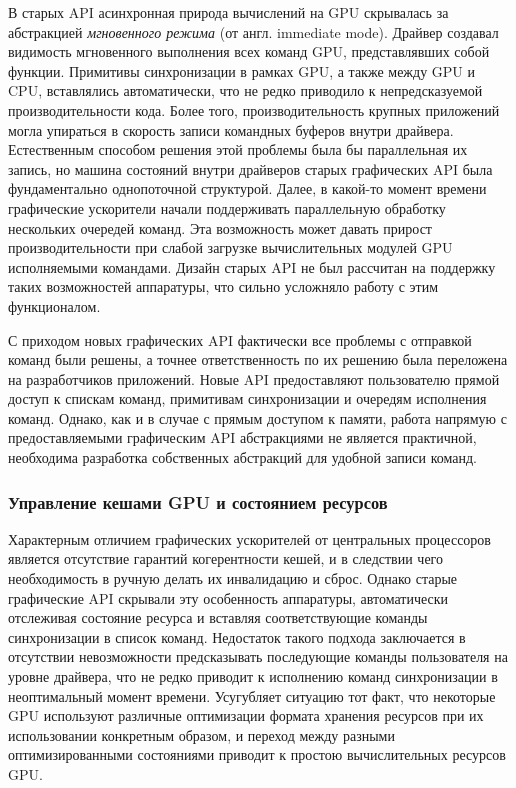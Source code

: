 В старых API асинхронная природа вычислений на GPU скрывалась за абстракцией \textit{мгновенного режима} (от англ. immediate mode).
Драйвер создавал видимость мгновенного выполнения всех команд GPU, представлявших собой функции.
Примитивы синхронизации в рамках GPU, а также между GPU и CPU, вставлялись автоматически, что не редко приводило к непредсказуемой производительности кода.
Более того, производительность крупных приложений могла упираться в скорость записи командных буферов внутри драйвера.
Естественным способом решения этой проблемы была бы параллельная их запись, но машина состояний внутри драйверов старых графических API была фундаментально однопоточной структурой.
Далее, в какой-то момент времени графические ускорители начали поддерживать параллельную обработку нескольких очередей команд.
Эта возможность может давать прирост производительности при слабой загрузке вычислительных модулей GPU исполняемыми командами.
Дизайн старых API не был рассчитан на поддержку таких возможностей аппаратуры, что сильно усложняло работу с этим функционалом.

С приходом новых графических API фактически все проблемы с отправкой команд были решены, а точнее ответственность по их решению была переложена на разработчиков приложений.
Новые API предоставляют пользователю прямой доступ к спискам команд, примитивам синхронизации и очередям исполнения команд.
Однако, как и в случае с прямым доступом к памяти, работа напрямую с предоставляемыми графическим API абстракциями не является практичной, необходима разработка собственных абстракций для удобной записи команд.

\subsubsection{Управление кешами GPU и состоянием ресурсов}
Характерным отличием графических ускорителей от центральных процессоров является отсутствие гарантий когерентности кешей, и в следствии чего необходимость в ручную делать их инвалидацию и сброс.
Однако старые графические API скрывали эту особенность аппаратуры, автоматически отслеживая состояние ресурса и вставляя соответствующие команды синхронизации в список команд.
Недостаток такого подхода заключается в отсутствии невозможности предсказывать последующие команды пользователя на уровне драйвера, что не редко приводит к исполнению команд синхронизации в неоптимальный момент времени.
Усугубляет ситуацию тот факт, что некоторые GPU используют различные оптимизации формата хранения ресурсов при их использовании конкретным образом, и переход между разными оптимизированными состояниями приводит к простою вычислительных ресурсов GPU.

